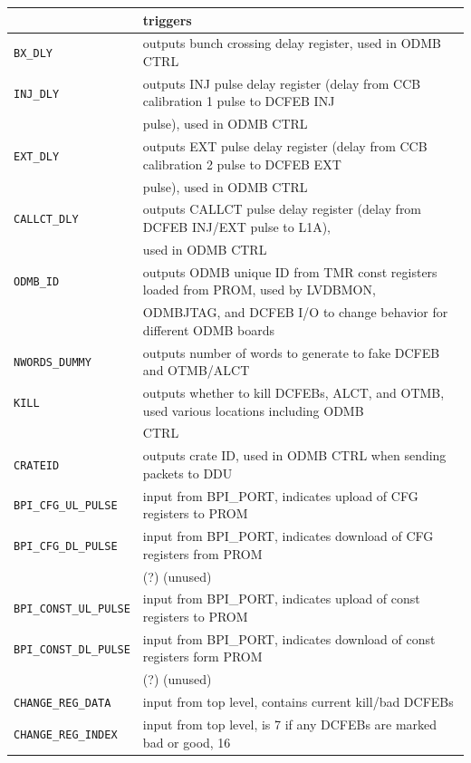 \documentclass[10pt,a4paper]{article}
\begin{document}
\begin{table}[H]
\begin{tabular}{|l|l|}
												& triggers\\ \hline
\texttt{BX\_DLY}& outputs bunch crossing delay register, used in ODMB CTRL\\ \hline
\texttt{INJ\_DLY}& outputs INJ pulse delay register (delay from CCB calibration 1 pulse to DCFEB INJ \\
                 & pulse), used in ODMB CTRL\\ \hline
\texttt{EXT\_DLY}& outputs EXT pulse delay register (delay from CCB calibration 2 pulse to DCFEB EXT \\
                 & pulse), used in ODMB CTRL\\ \hline
\texttt{CALLCT\_DLY}& outputs CALLCT pulse delay register (delay from DCFEB INJ/EXT pulse to L1A), \\
                 & used in ODMB CTRL\\ \hline
\texttt{ODMB\_ID}& outputs ODMB unique ID from TMR const registers loaded from PROM, used by LVDBMON,\\
                 & ODMBJTAG, and DCFEB I/O to change behavior for different ODMB boards\\ \hline
\texttt{NWORDS\_DUMMY}& outputs number of words to generate to fake DCFEB and OTMB/ALCT\\ \hline
\texttt{KILL}& outputs whether to kill DCFEBs, ALCT, and OTMB, used various locations including ODMB \\
             & CTRL\\ \hline
\texttt{CRATEID}& outputs crate ID, used in ODMB CTRL when sending packets to DDU\\ \hline
\texttt{BPI\_CFG\_UL\_PULSE}& input from BPI\_PORT, indicates upload of CFG registers to PROM\\ \hline
\texttt{BPI\_CFG\_DL\_PULSE}& input from BPI\_PORT, indicates download of CFG registers from PROM \\
                            & (?) (unused)\\ \hline
\texttt{BPI\_CONST\_UL\_PULSE}& input from BPI\_PORT, indicates upload of const registers to PROM\\ \hline
\texttt{BPI\_CONST\_DL\_PULSE}& input from BPI\_PORT, indicates download of const registers form PROM \\
                              & (?) (unused)\\ \hline
\texttt{CHANGE\_REG\_DATA}& input from top level, contains current kill/bad DCFEBs\\ \hline
\texttt{CHANGE\_REG\_INDEX}& input from top level, is 7 if any DCFEBs are marked bad or good, 16 \\

\end{tabular}
\end{table}
\end{document}
